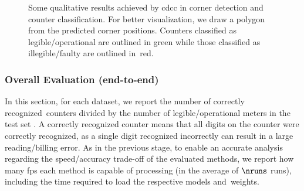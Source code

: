 \begin{figure}[!htb]
    \centering

    \vspace{0.45mm}
    

    \vspace{-1.25mm}
    
    \caption{\small Some qualitative results achieved by \gls*{cdcc} in corner detection and counter classification. For better visualization, we draw a polygon from the predicted corner positions. Counters classified as legible/operational are outlined in green while those classified as illegible/faulty are outlined in~red. 
    }
    \label{fig:results-cdcc}
\end{figure}

\subsubsection{Overall Evaluation (end-to-end)}
\label{sec:results:overall}

In this section, for each dataset, we report the number of correctly recognized~counters divided by the number of legible/operational meters in the test set .
A correctly recognized counter means that all digits on the counter were correctly recognized, as a single digit recognized incorrectly can result in a large reading/billing error.
As in the previous stage, to enable an accurate analysis regarding the speed/accuracy trade-off of the evaluated methods, we report how many \gls*{fps} each method is capable of processing (in the average of $\nruns$ runs), including the time required to load the respective models and~weights.

